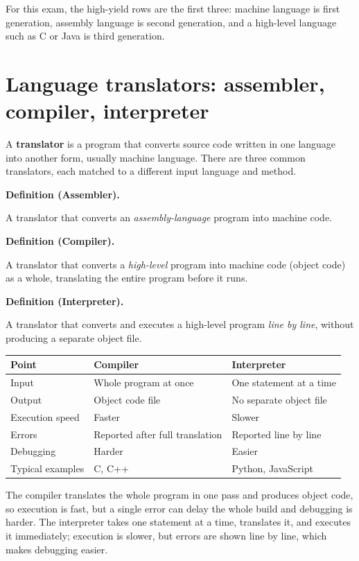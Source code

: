 \documentclass[11pt]{article}
\newenvironment{definitionbox}[1]{%
  \par\noindent\textbf{Definition (#1).}\ \itshape
}{\par\vspace{0.3em}}
\begin{document}
For this exam, the high-yield rows are the first three: machine language is
first generation, assembly language is second generation, and a high-level
language such as C or Java is third generation.

\section{Language translators: assembler, compiler, interpreter}
A \textbf{translator} is a program that converts source code written in one
language into another form, usually machine language. There are three common
translators, each matched to a different input language and method.

\begin{definitionbox}{Assembler}
A translator that converts an \emph{assembly-language} program into machine
code.
\end{definitionbox}

\begin{definitionbox}{Compiler}
A translator that converts a \emph{high-level} program into machine code (object
code) as a whole, translating the entire program before it runs.
\end{definitionbox}

\begin{definitionbox}{Interpreter}
A translator that converts and executes a high-level program
\emph{line by line}, without producing a separate object file.
\end{definitionbox}

\begin{center}
\begin{tabular}{p{}p{}p{}}
\toprule
\textbf{Point} & \textbf{Compiler} & \textbf{Interpreter} \\
\midrule
Input & Whole program at once & One statement at a time \\
Output & Object code file & No separate object file \\
Execution speed & Faster & Slower \\
Errors & Reported after full translation & Reported line by line \\
Debugging & Harder & Easier \\
Typical examples & C, C++ & Python, JavaScript \\
\bottomrule
\end{tabular}
\end{center}

The compiler translates the whole program in one pass and produces object
code, so execution is fast, but a single error can delay the whole build and
debugging is harder. The interpreter takes one statement at a time, translates
it, and executes it immediately; execution is slower, but errors are shown
line by line, which makes debugging easier.
\end{document}
